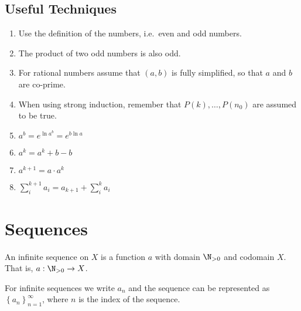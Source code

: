 \documentclass{article}
\begin{document}
\subsection{Useful Techniques}
\nopagebreak
\begin{multicols}{2}
    \begin{enumerate}
        \item Use the definition of the numbers, i.e.\ even and odd numbers.
        \item The product of two odd numbers is also odd.
        \item For rational numbers assume that \((a,b)\) is fully simplified, so that \(a\) and \(b\) are co-prime.
        \item When using strong induction, remember that \(P(k), \ldots, P(n_0)\) are assumed to be true.
              \columnbreak
        \item \(a^b=e^{\ln{a^b}}=e^{b\ln{a}}\)
        \item \(a^k = a^k + b - b\)
        \item \(a^{k+1} = a \cdot a^k\)
        \item \(\sum_{i}^{k+1} a_i = a_{k+1} + \sum_{i}^{k} a_i\)
    \end{enumerate}
\end{multicols}
%
\section{Sequences}
An infinite sequence on \(X\) is a function \(a\) with domain \(\N_{> 0}\) and codomain \(X\). That is, \(a:\N_{> 0}\to X\).

For infinite sequences we write \(a_n\) and the sequence can be represented as \(\left\{a_n\right\}_{n=1}^\infty\), where \(n\) is the index of the sequence.
%
\end{document}
